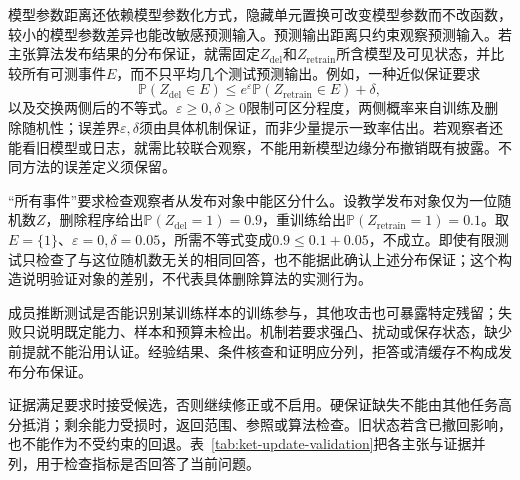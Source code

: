 模型参数距离还依赖模型参数化方式，隐藏单元置换可改变模型参数而不改函数，较小的模型参数差异也能改敏感预测输入。预测输出距离只约束观察预测输入。若主张算法发布结果的分布保证，就需固定$Z_{\mathrm{del}}$和$Z_{\mathrm{retrain}}$所含模型及可见状态，并比较所有可测事件$E$，而不只平均几个测试预测输出。例如，一种近似保证要求
\[
\mathbb P(Z_{\mathrm{del}}\in E)
\le e^\varepsilon\mathbb P(Z_{\mathrm{retrain}}\in E)+\delta,
\]
以及交换两侧后的不等式。$\varepsilon\geq0,\delta\geq0$限制可区分程度，两侧概率来自训练及删除随机性；误差界$\varepsilon,\delta$须由具体机制保证，而非少量提示一致率估出。若观察者还能看旧模型或日志，就需比较联合观察，不能用新模型边缘分布撤销既有披露。不同方法的误差定义须保留。

“所有事件”要求检查观察者从发布对象中能区分什么。设教学发布对象仅为一位随机数$Z$，删除程序给出$\mathbb P(Z_{\mathrm{del}}=1)=0.9$，重训练给出$\mathbb P(Z_{\mathrm{retrain}}=1)=0.1$。取$E=\{1\}$、$\varepsilon=0,\delta=0.05$，所需不等式变成$0.9\leq0.1+0.05$，不成立。即使有限测试只检查了与这位随机数无关的相同回答，也不能据此确认上述分布保证；这个构造说明验证对象的差别，不代表具体删除算法的实测行为。

成员推断测试是否能识别某训练样本的训练参与，其他攻击也可暴露特定残留；失败只说明既定能力、样本和预算未检出。机制若要求强凸、扰动或保存状态，缺少前提就不能沿用认证。经验结果、条件核查和证明应分列，拒答或清缓存不构成发布分布保证。

证据满足要求时接受候选，否则继续修正或不启用。硬保证缺失不能由其他任务高分抵消；剩余能力受损时，返回范围、参照或算法检查。旧状态若含已撤回影响，也不能作为不受约束的回退。表~\ref{tab:ket-update-validation}把各主张与证据并列，用于检查指标是否回答了当前问题。

